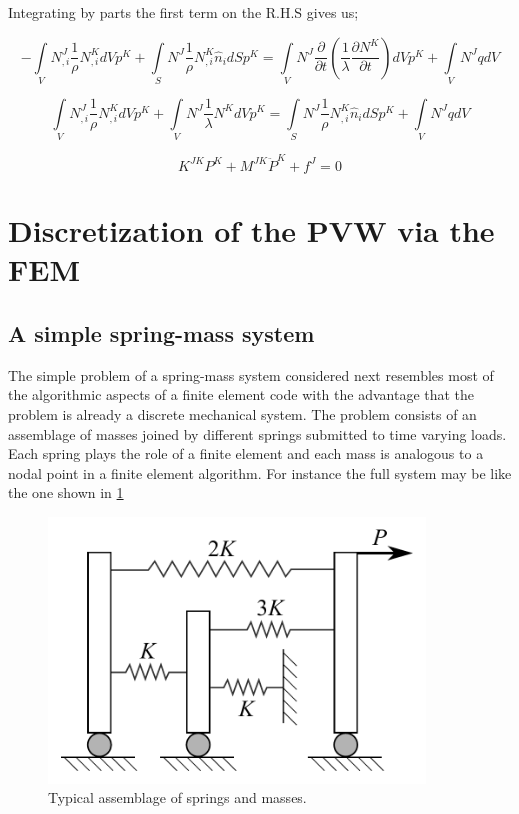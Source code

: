 Integrating by parts the first term on the R.H.S gives us;

\[ - \int\limits_V {N_{,i}^J\frac{1}{\rho }N_{,i}^KdV} {p^K} + \int\limits_S {{N^J}\frac{1}{\rho }N_{,i}^K{{\hat n}_i}dS{p^K}}  = \int\limits_V {{N^J}\frac{\partial }{{\partial t}}\left( {\frac{1}{\lambda }\frac{{\partial {N^K}}}{{\partial t}}} \right)dV{p^K}}  + \int\limits_V {{N^J}qdV} \]

\[\int\limits_V {N_{,i}^J\frac{1}{\rho }N_{,i}^KdV} {p^K} + \int\limits_V {{N^J}\frac{1}{\lambda }{N^K}dV{{\ddot p}^K}}  = \int\limits_S {{N^J}\frac{1}{\rho }N_{,i}^K{{\hat n}_i}dS{p^K}}  + \int\limits_V {{N^J}qdV} \]

\[{K^{JK}}{P^K} + {M^{JK}}{{\ddot P}^K} + {f^J} = 0\]


\section[Discretization of the PVW using FEM]{Discretization of the PVW via the FEM}

\subsection*{A simple spring-mass system}
The simple problem of a spring-mass system considered next resembles most of the algorithmic aspects of a finite element code with the advantage that the problem is already a discrete mechanical system. The problem consists of an assemblage of masses joined by different springs submitted to time varying loads. Each spring plays the role of a finite element and each mass is analogous to a nodal point in a finite element algorithm. For instance the full system may be like the one shown in \cref{fig:bathe}
\begin{figure}[H]
\centering
\includegraphics[width=10cm]{spring_system.pdf}
\caption{Typical assemblage of springs and masses.}
\label{fig:bathe}
\end{figure}


